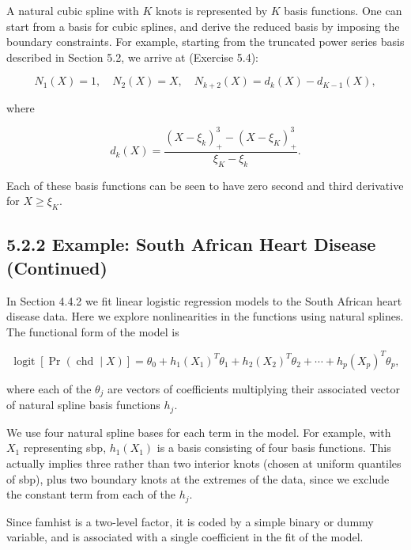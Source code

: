 \documentclass[10pt]{article}
\begin{document}
A natural cubic spline with $K$ knots is represented by $K$ basis functions. One can start from a basis for cubic splines, and derive the reduced basis by imposing the boundary constraints. For example, starting from the truncated power series basis described in Section 5.2, we arrive at (Exercise 5.4):


\begin{equation*}
N_{1}(X)=1, \quad N_{2}(X)=X, \quad N_{k+2}(X)=d_{k}(X)-d_{K-1}(X), \tag{5.4}
\end{equation*}


where


\begin{equation*}
d_{k}(X)=\frac{\left(X-\xi_{k}\right)_{+}^{3}-\left(X-\xi_{K}\right)_{+}^{3}}{\xi_{K}-\xi_{k}} . \tag{5.5}
\end{equation*}


Each of these basis functions can be seen to have zero second and third derivative for $X \geq \xi_{K}$.

\subsection*{5.2.2 Example: South African Heart Disease (Continued)}
In Section 4.4.2 we fit linear logistic regression models to the South African heart disease data. Here we explore nonlinearities in the functions using natural splines. The functional form of the model is


\begin{equation*}
\operatorname{logit}[\operatorname{Pr}(\operatorname{chd} \mid X)]=\theta_{0}+h_{1}\left(X_{1}\right)^{T} \theta_{1}+h_{2}\left(X_{2}\right)^{T} \theta_{2}+\cdots+h_{p}\left(X_{p}\right)^{T} \theta_{p}, \tag{5.6}
\end{equation*}


where each of the $\theta_{j}$ are vectors of coefficients multiplying their associated vector of natural spline basis functions $h_{j}$.

We use four natural spline bases for each term in the model. For example, with $X_{1}$ representing sbp, $h_{1}\left(X_{1}\right)$ is a basis consisting of four basis functions. This actually implies three rather than two interior knots (chosen at uniform quantiles of sbp), plus two boundary knots at the extremes of the data, since we exclude the constant term from each of the $h_{j}$.

Since famhist is a two-level factor, it is coded by a simple binary or dummy variable, and is associated with a single coefficient in the fit of the model.
\end{document}
